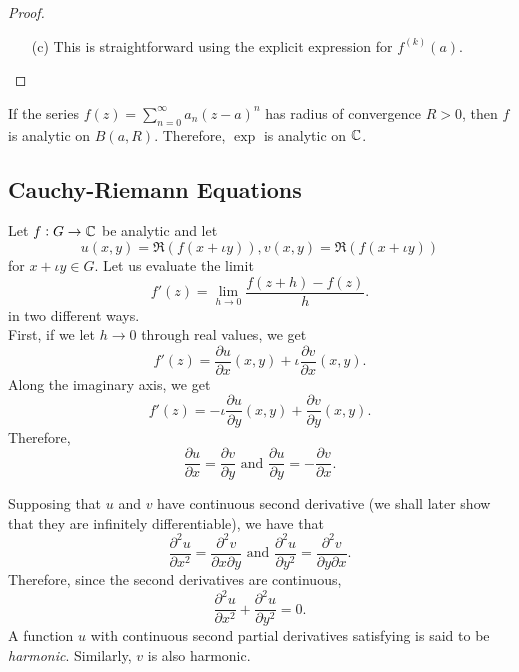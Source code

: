 \begin{proof}
\begin{itemize}
			\item[(c)] This is straightforward using the explicit expression for $f^{(k)}(a)$. \qedhere
		\end{itemize}
	\end{proof}

	If the series $f(z) = \sum_{n=0}^\infty a_n (z-a)^n$ has radius of convergence $R > 0$, then $f$ is analytic on $B(a,R)$. Therefore, $\exp$ is analytic on $\mathbb{C}$.



\subsection{Cauchy-Riemann Equations}

	Let $f:G\to\mathbb{C}$ be analytic and let
	\[ u(x,y) = \Re(f(x+\iota y)), v(x,y) = \Re(f(x+\iota y)) \]
	for $x+\iota y \in G$. Let us evaluate the limit
	\[ f'(z) = \lim_{h\to 0} \frac{f(z+h)-f(z)}{h}. \]
	in two different ways.\\
	First, if we let $h\to 0$ through real values, we get
	\[ f'(z) = \frac{\partial u}{\partial x}(x,y) + \iota \frac{\partial v}{\partial x}(x,y). \]
	Along the imaginary axis, we get
	\[ f'(z) = -\iota \frac{\partial u}{\partial y}(x,y) + \frac{\partial v}{\partial y}(x,y). \]
	Therefore,
	\[ \frac{\partial u}{\partial x} = \frac{\partial v}{\partial y} \text{ and } \frac{\partial u}{\partial y} = - \frac{\partial v}{\partial x}. \]

	Supposing that $u$ and $v$ have continuous second derivative (we shall later show that they are infinitely differentiable), we have that
	\[ \frac{\partial^2 u}{\partial x^2} = \frac{\partial^2 v}{\partial x \partial y} \text{ and } \frac{\partial^2 u}{\partial y^2} = \frac{\partial^2 v}{\partial y \partial x}. \]
	Therefore, since the second derivatives are continuous,
	\begin{equation}
		\label{eqn-harmonic}
		\frac{\partial^2 u}{\partial x^2} + \frac{\partial^2 u}{\partial y^2} = 0.
	\end{equation}
	A function $u$ with continuous second partial derivatives satisfying  is said to be \emph{harmonic}. Similarly, $v$ is also harmonic.

